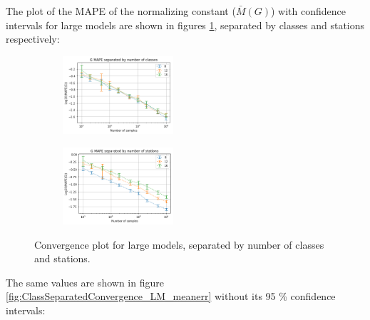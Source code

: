 The plot of the MAPE of the normalizing constant (\(\bar{M}(G)\)) with confidence intervals for large models are shown in figures \ref{fig:ClassSeparatedConvergence_LM}, separated by classes and stations respectively:

\begin{figure}[!htb]
\begin{center}
\begin{subfigure}
    \centering
    \includegraphics[width=0.45\textwidth]{Chap6_EvaluationAndAnalysis/images/ConvergenceNumberOfClasses_LM.png}
\end{subfigure}
\begin{subfigure}
    \centering
    \includegraphics[width=0.45\textwidth]{Chap6_EvaluationAndAnalysis/images/ConvergenceNumberOfStations_LM.png}
\end{subfigure}
\caption{Convergence plot for large models, separated by number of classes and stations.}
\label{fig:ClassSeparatedConvergence_LM}
\end{center}
\end{figure}

The same values are shown in figure \ref{fig:ClassSeparatedConvergence_LM_meanerr} without its 95 \% confidence intervals:

